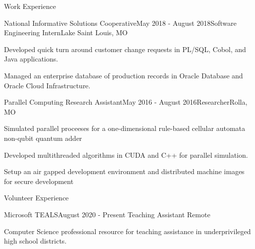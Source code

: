 \documentclass{resume}
\begin{document}
\begin{rSection}{Work Experience}
\begin{rSubsection}{National Informative Solutions Cooperative}{May 2018 - August 2018}{Software Engineering Intern}{Lake Saint Louis, MO}
    \item Developed quick turn around customer change requests in PL/SQL, Cobol, and Java applications.
    \item Managed an enterprise database of production records in Oracle Database and Oracle Cloud Infrastructure. 
\end{rSubsection}
\begin{rSubsection}{Parallel Computing Research Assistant}{May 2016 - August 2016}{Researcher}{Rolla, MO}
    \item Simulated parallel proceeses for a one-dimensional rule-based cellular automata non-qubit quantum adder 
    \item Developed multithreaded algorithms in CUDA and C++ for parallel simulation. 
    \item Setup an air gapped development environment and distributed machine images for secure development
\end{rSubsection}
\end{rSection} 

\begin{rSection}{Volunteer Experience}
\begin{rSubsection}{Microsoft TEALS}{August 2020 - Present} {Teaching Assistant} {Remote} 
    \item Computer Science professional resource for teaching assistance in underprivileged high school districts.
\end{rSubsection}

\end{rSection}
\end{document}
